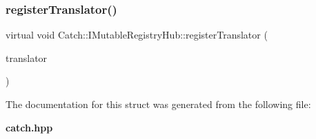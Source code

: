 \mbox{\label{struct_catch_1_1_i_mutable_registry_hub_ae6825365102693cf7707db022a2c2b49}} 
\subsubsection{registerTranslator()}
{\footnotesize\ttfamily virtual void Catch\+::\+I\+Mutable\+Registry\+Hub\+::register\+Translator (\begin{DoxyParamCaption}\item[{const \textbf{ I\+Exception\+Translator} $\ast$}]{translator }\end{DoxyParamCaption})\hspace{0.3cm}{\ttfamily [pure virtual]}}



The documentation for this struct was generated from the following file\+:\begin{DoxyCompactItemize}
\item 
\textbf{ catch.\+hpp}\end{DoxyCompactItemize}
